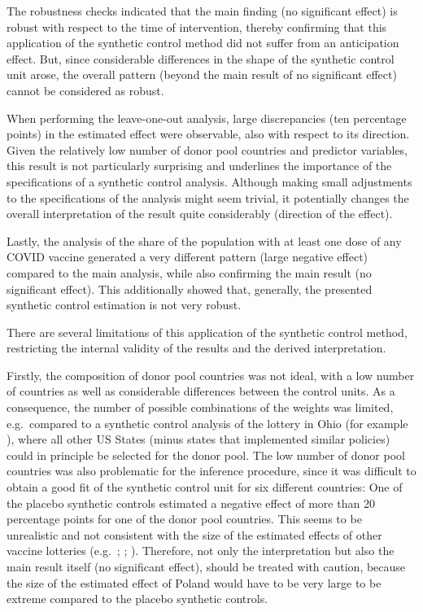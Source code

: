 \documentclass{scrbook}
\begin{document}
The robustness checks indicated that the main finding (no significant
effect) is robust with respect to the time of intervention, thereby
confirming that this application of the synthetic control method did not
suffer from an anticipation effect. But, since considerable differences
in the shape of the synthetic control unit arose, the overall pattern
(beyond the main result of no significant effect) cannot be considered
as robust.

When performing the leave-one-out analysis, large discrepancies (ten
percentage points) in the estimated effect were observable, also with
respect to its direction. Given the relatively low number of donor pool
countries and predictor variables, this result is not particularly
surprising and underlines the importance of the specifications of a
synthetic control analysis. Although making small adjustments to the
specifications of the analysis might seem trivial, it potentially
changes the overall interpretation of the result quite considerably
(direction of the effect).

Lastly, the analysis of the share of the population with at least one
dose of any COVID vaccine generated a very different pattern (large
negative effect) compared to the main analysis, while also confirming
the main result (no significant effect). This additionally showed that,
generally, the presented synthetic control estimation is not very
robust.

There are several limitations of this application of the synthetic
control method, restricting the internal validity of the results and the
derived interpretation.

Firstly, the composition of donor pool countries was not ideal, with a
low number of countries as well as considerable differences between the
control units. As a consequence, the number of possible combinations of
the weights was limited, e.g.~compared to a synthetic control analysis
of the lottery in Ohio (for example \textcite{barber_conditional_2022}),
where all other US States (minus states that implemented similar
policies) could in principle be selected for the donor pool. The low
number of donor pool countries was also problematic for the inference
procedure, since it was difficult to obtain a good fit of the synthetic
control unit for six different countries: One of the placebo synthetic
controls estimated a negative effect of more than 20 percentage points
for one of the donor pool countries. This seems to be unrealistic and
not consistent with the size of the estimated effects of other vaccine
lotteries (e.g.~\cite{robertson_are_2021};
\cite{acharya_implementation_2021}; \cite{fuller_assessing_2022}).
Therefore, not only the interpretation but also the main result itself
(no significant effect), should be treated with caution, because the
size of the estimated effect of Poland would have to be very large to be
extreme compared to the placebo synthetic controls.
\end{document}
